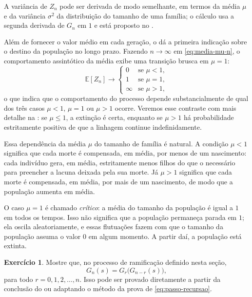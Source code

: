 \documentclass[12pt,portuguese]{article}
\theoremstyle{definition}
\theoremstyle{plainexercise}
\newtheorem{exercise}{Exercício}
\theoremstyle{starredexercise}
\theoremstyle{definition}
\begin{document}
A variância de $Z_n$ pode ser derivada de modo semelhante, em termos da
média $\mu$ e da variância $\sigma^2$ da distribuição do tamanho de uma família;
o cálculo usa a segunda derivada de $G_n$ em $1$ e está proposto
no .


\bigskip

Além de fornecer o valor médio em cada geração, o 
dá a primeira indicação sobre o destino da população no longo prazo.
Fazendo $n\to\infty$ em \eqref{eq:media-mu-n}, o comportamento assintótico
da média exibe uma transição brusca em $\mu=1$:
\[
\mathbb{E}[Z_n] \to
\begin{cases}
0 & \text{se } \mu<1,\\
1 & \text{se } \mu=1,\\
\infty & \text{se } \mu>1,
\end{cases}
\]
o que indica que o comportamento do processo depende substancialmente
de qual dos três casos $\mu<1$, $\mu=1$ ou $\mu>1$ ocorre.
Veremos esse contraste com mais detalhe na :
se $\mu\leqslant 1$, a extinção é certa, enquanto se $\mu>1$ há
probabilidade estritamente positiva de que a linhagem continue
indefinidamente.

Essa dependência da média $\mu$ do tamanho de família é natural.
A condição $\mu<1$ significa que cada morte é compensada, em média,
por menos de um nascimento: cada indivíduo gera, em média, estritamente
menos filhos do que o necessário para preencher a lacuna deixada pela sua
morte.
Já $\mu>1$ significa que cada morte é compensada, em média, por mais
de um nascimento, de modo que a população aumenta em média.

O caso $\mu=1$ é chamado \emph{crítico}: a média do tamanho da população
é igual a $1$ em todos os tempos. Isso não significa que a população
permaneça parada em $1$; ela oscila aleatoriamente, e essas flutuações
fazem com que o tamanho da população assuma o valor $0$ em algum momento.
A partir daí, a população está extinta.

\begin{exercise}\label{exercise:composicao-geracoes}
Mostre que, no processo de ramificação definido nesta seção,
\[
G_n(s) = G_r\bigl(G_{n-r}(s)\bigr),
\]
para todo $r = 0, 1, 2, \ldots, n$. Isso pode ser provado diretamente
a partir da conclusão do  ou adaptando o método
da prova de \eqref{eq:passo-recursao}.
\end{exercise}
\end{document}
